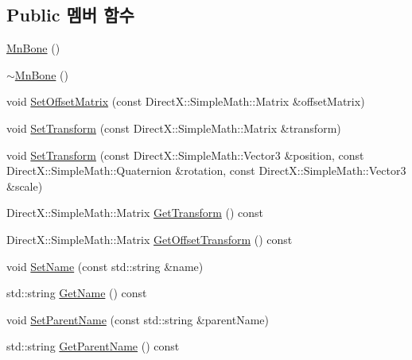 \subsection*{Public 멤버 함수}
\begin{DoxyCompactItemize}
\item 
\hyperlink{class_m_n_l_1_1_mn_bone_a2f2a084d73c21440e718c3a67a94355b}{Mn\+Bone} ()
\item 
\hyperlink{class_m_n_l_1_1_mn_bone_a56cefd0c1acf49770e49748fe2a3a51d}{$\sim$\+Mn\+Bone} ()
\item 
void \hyperlink{class_m_n_l_1_1_mn_bone_a523fe1078ba5b534b316d38748cb2625}{Set\+Offset\+Matrix} (const Direct\+X\+::\+Simple\+Math\+::\+Matrix \&offset\+Matrix)
\item 
void \hyperlink{class_m_n_l_1_1_mn_bone_a23ab583dd181a53935357ec51e376d9a}{Set\+Transform} (const Direct\+X\+::\+Simple\+Math\+::\+Matrix \&transform)
\item 
void \hyperlink{class_m_n_l_1_1_mn_bone_ad0b53762b81d65568955c67e59a7c845}{Set\+Transform} (const Direct\+X\+::\+Simple\+Math\+::\+Vector3 \&position, const Direct\+X\+::\+Simple\+Math\+::\+Quaternion \&rotation, const Direct\+X\+::\+Simple\+Math\+::\+Vector3 \&scale)
\item 
Direct\+X\+::\+Simple\+Math\+::\+Matrix \hyperlink{class_m_n_l_1_1_mn_bone_a404d1fc423d63715cd0a8bbe3afdaac7}{Get\+Transform} () const
\item 
Direct\+X\+::\+Simple\+Math\+::\+Matrix \hyperlink{class_m_n_l_1_1_mn_bone_a30963b69412919ada3ca5f166faf846f}{Get\+Offset\+Transform} () const
\item 
void \hyperlink{class_m_n_l_1_1_mn_bone_a36b9b60148969ce31bc74a4bbd4c56cf}{Set\+Name} (const std\+::string \&name)
\item 
std\+::string \hyperlink{class_m_n_l_1_1_mn_bone_a7780138cc897c4358c276cbe04c2868c}{Get\+Name} () const
\item 
void \hyperlink{class_m_n_l_1_1_mn_bone_a7be990cbdf3f123a6649b8de9968ac0f}{Set\+Parent\+Name} (const std\+::string \&parent\+Name)
\item 
std\+::string \hyperlink{class_m_n_l_1_1_mn_bone_a476cfd8bcfebded34cbcbfd08d6a44b2}{Get\+Parent\+Name} () const
\end{DoxyCompactItemize}
